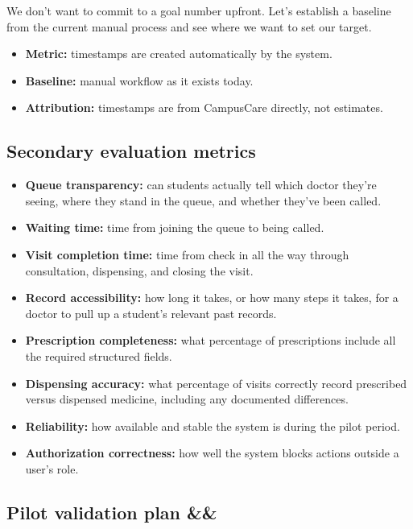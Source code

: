 \documentclass[11pt,a4paper]{article}
\newcommand{\BvrHint}[1]{%
  \ifx&#1&%
  \else
    {\normalfont\normalsize\itshape\hfill #1}%
  \fi}
\begin{document}
We don't want to commit to a goal number upfront. Let's establish a baseline from the current manual process and see where we want to set our target.

\begin{itemize}
    \item \textbf{Metric:} timestamps are created automatically by the system.
    \item \textbf{Baseline:} manual workflow as it exists today.
    \item \textbf{Attribution:} timestamps are from CampusCare directly, not estimates.
\end{itemize}

\subsection{Secondary evaluation metrics}

\begin{itemize}
    \item \textbf{Queue transparency:} can students actually tell which doctor they're seeing, where they stand in the queue, and whether they've been called.
    \item \textbf{Waiting time:} time from joining the queue to being called.
    \item \textbf{Visit completion time:} time from check in all the way through consultation, dispensing, and closing the visit.
    \item \textbf{Record accessibility:} how long it takes, or how many steps it takes, for a doctor to pull up a student's relevant past records.
    \item \textbf{Prescription completeness:} what percentage of prescriptions include all the required structured fields.
    \item \textbf{Dispensing accuracy:} what percentage of visits correctly record prescribed versus dispensed medicine, including any documented differences.
    \item \textbf{Reliability:} how available and stable the system is during the pilot period.
    \item \textbf{Authorization correctness:} how well the system blocks actions outside a user's role.
\end{itemize}

\subsection{Pilot validation plan \BvrHint{}}
\end{document}
